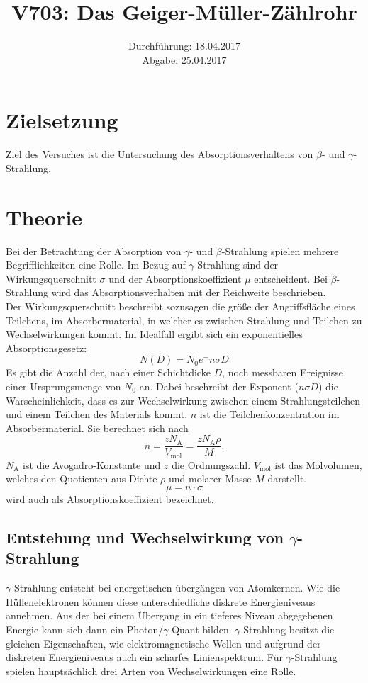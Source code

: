 \documentclass[
  bibliography=totoc,     %
  captions=tableheading,  %
  titlepage=firstiscover, %
]{scrartcl}
\title{V703: Das Geiger-Müller-Zählrohr}
\author{
  Simon Schulte
  \texorpdfstring{
    \\
    \href{mailto:simon.schulte@udo.edu}{simon.schulte@udo.edu}
  }{}
  \texorpdfstring{\and}{, }
  Tim Sedlaczek
  \texorpdfstring{
    \\
    \href{mailto:tim.sedlaczek@udo.edu}{tim.sedlaczek@udo.edu}
  }{}
}
\date{Durchführung: 18.04.2017\\
      Abgabe: 25.04.2017}
\begin{document}
\setcounter{page}{1}
\section{Zielsetzung}
\label{sec:zielsetzung}
Ziel des Versuches ist die Untersuchung des Absorptionsverhaltens von $\beta$-
und $\gamma$-Strahlung.
\section{Theorie}
\label{sec:theorie}
Bei der Betrachtung der Absorption von $\gamma$- und $\beta$-Strahlung
spielen mehrere Begrifflichkeiten eine Rolle.
Im Bezug auf $\gamma$-Strahlung sind der Wirkungsquerschnitt $\sigma$ und
der Absorptionskoeffizient $\mu$ entscheident.
Bei $\beta$-Strahlung wird das Absorptionsverhalten mit der Reichweite
beschrieben.\\

\noindent
Der Wirkungsquerschnitt beschreibt sozusagen die größe der Angriffsfläche
eines Teilchens, im Absorbermaterial, in welcher es zwischen Strahlung
und Teilchen zu Wechselwirkungen kommt.
Im Idealfall ergibt sich ein exponentielles Absorptionsgesetz:
\begin{equation}
  N \left( D \right) = N_0 e^-n \sigma D
  \label{eqn:absorption}
\end{equation}
Es gibt die Anzahl der, nach einer Schichtdicke $D$, noch messbaren Ereignisse
einer Ursprungsmenge von $N_0$ an.
Dabei beschreibt der Exponent ($n \sigma D$) die Warscheinlichkeit, dass
es zur Wechselwirkung zwischen einem Strahlungsteilchen und einem Teilchen
des Materials kommt. $n$ ist die Teilchenkonzentration im Absorbermaterial.
Sie berechnet sich nach
\begin{equation}
  n = \frac{z N_\mathup{A}}{V_\mathup{mol}} = \frac{z N_\mathup{A} \rho}{M}.
  \label{eqn:teilchenkonz}
\end{equation}
$N_\mathup{A}$ ist die Avogadro-Konstante und $z$ die Ordnungszahl.
$V_\mathup{mol}$ ist das Molvolumen, welches den Quotienten aus Dichte
$\rho$ und molarer Masse $M$ darstellt.
\begin{equation}
  \mu = n \cdot \sigma
  \label{eqn:mu_theo}
\end{equation}
wird auch als Absorptionskoeffizient bezeichnet.

\subsection{Entstehung und Wechselwirkung von \texorpdfstring{$\gamma$}{gamma}-Strahlung}
$\gamma$-Strahlung entsteht bei energetischen übergängen von Atomkernen.
Wie die Hüllenelektronen können diese unterschiedliche diskrete Energieniveaus
annehmen. Aus der bei einem Übergang in ein tieferes Niveau abgegebenen Energie
kann sich dann ein Photon/$\gamma$-Quant bilden. $\gamma$-Strahlung besitzt die
gleichen Eigenschaften, wie elektromagnetische Wellen und aufgrund der diskreten
Energieniveaus auch ein scharfes Linienspektrum.
Für $\gamma$-Strahlung spielen hauptsächlich drei Arten von Wechselwirkungen
eine Rolle.
\end{document}

